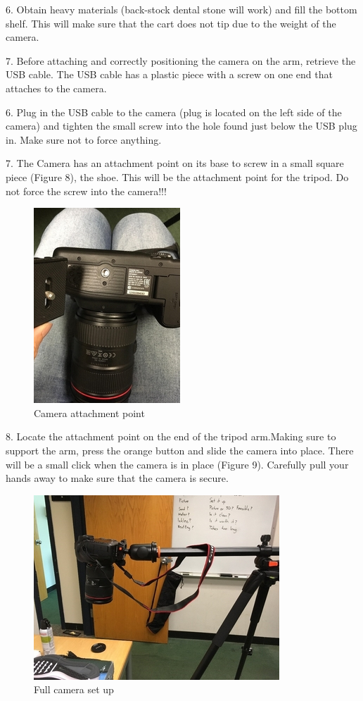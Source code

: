 \newpage


6. Obtain heavy materials (back-stock dental stone will work) and fill the bottom shelf. This will make sure that the cart does not tip due to the weight of the camera. 

7. Before attaching and correctly positioning the camera on the arm, retrieve the USB cable. The USB cable has a plastic piece with a screw on one end that attaches to the camera.

6.	Plug in the USB cable to the camera (plug is located on the left side of the camera) and tighten the small screw into the hole found just below the USB plug in. Make sure not to force anything. 

7.	The Camera has an attachment point on its base to screw in a small square piece (Figure 8), the shoe. This will be the attachment point for the tripod. Do not force the screw into the camera!!!

\begin{figure}[!htp]
\centering
\includegraphics[scale=2]{Camera__2_}
\caption{Camera attachment point}
\label{img:Image 8}
\end{figure}

\newpage

8. Locate the attachment point on the end of the tripod arm.Making sure to support the arm, press the orange button and slide the camera into place. There will be a small click when the camera is in place (Figure 9). Carefully pull your hands away to make sure that the camera is secure. 

\begin{figure}[!htp]
\centering
\includegraphics[scale=1.9]{Full_Set_Up}
\caption{Full camera set up}
\label{Image 9}
\end{figure}

